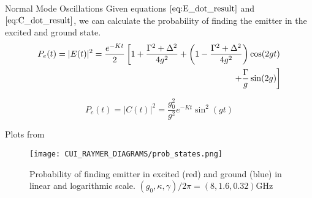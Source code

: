 \begin{frame}{Normal Mode Oscillations}
    Given equations $\eqref{eq:E_dot_result}$ and $\eqref{eq:C_dot_result}$,  we can calculate the probability of finding the emitter in the excited and ground state. 
    \begin{equation}
    \label{eq:probability_E}
    \begin{split}
         P_{e} (t) = |E(t)|^2= \frac{e^{-K t}}{2} \left[ 1 + \frac{\Gamma^2 + \Delta^2}{4g^2} +\left( 1 - \frac{\Gamma^2 + \Delta^2 }{4 g^2}\right) \cos(2 g t) \right. \\
         \left. + \frac{\Gamma}{g} \sin(2 g) \vphantom{ \frac{\Gamma^2 + \Delta^2}{4g^2} +\left( 1 - \frac{\Gamma^2 + \Delta^2 }{4 g^2}\right)} \right ]
    \end{split}
    \end{equation}
    
    \begin{equation}
        \label{eq:probability_C}
        P_c (t) = |C(t)|^2 = \frac{g_0^2}{g^2}e^{-K t} \sin^2(g t)
    \end{equation}
\end{frame}

\begin{frame}{Plots from \citep{Cui2006}}
    \begin{figure}
        \centering
        \texttt{[image: CUI\_RAYMER\_DIAGRAMS/prob\_states.png]}
        \caption{Probability of finding emitter in excited (red) and ground (blue) in linear and logarithmic scale. $(g_0,\kappa,\gamma)/2 \pi = (8,1.6,0.32)$GHz}
        \label{fig:Probabilities}
    \end{figure}
\end{frame}

